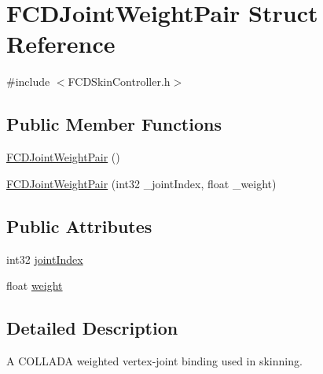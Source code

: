 \hypertarget{structFCDJointWeightPair}{
\section{FCDJointWeightPair Struct Reference}
\label{structFCDJointWeightPair}
}


{\ttfamily \#include $<$FCDSkinController.h$>$}

\subsection*{Public Member Functions}
\begin{DoxyCompactItemize}
\item 
\hyperlink{structFCDJointWeightPair_adb720c80d8fde84e5fdecf16f9b6de8a}{FCDJointWeightPair} ()
\item 
\hyperlink{structFCDJointWeightPair_a3c34c929311b6d2b555f91c18c230090}{FCDJointWeightPair} (int32 \_\-jointIndex, float \_\-weight)
\end{DoxyCompactItemize}
\subsection*{Public Attributes}
\begin{DoxyCompactItemize}
\item 
int32 \hyperlink{structFCDJointWeightPair_a12f6483d8748e4cca1089064b1934a3b}{jointIndex}
\item 
float \hyperlink{structFCDJointWeightPair_a375a6320fef00a704bbdaf67097f8552}{weight}
\end{DoxyCompactItemize}


\subsection{Detailed Description}
A COLLADA weighted vertex-\/joint binding used in skinning. 

